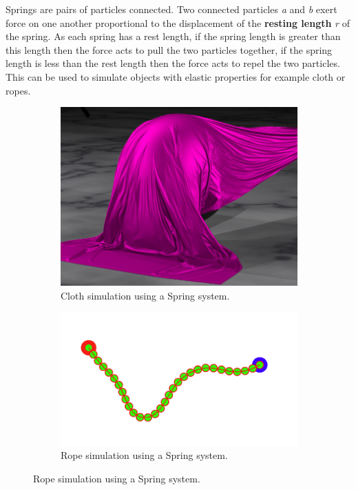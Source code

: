 Springs are pairs of particles connected. Two connected particles \emph{a} and \emph{b} exert force on one another proportional to the displacement of the \textbf{resting length} \emph{r} of the spring. As each spring has a rest length, if the spring length is greater than this length then the force acts to pull the two particles together, if the spring length is less than the rest length then the force acts to repel the two particles. This can be used to simulate objects with elastic properties for example cloth or ropes.
\begin{figure}
	\begin{subfigure}[b]{0.4\textwidth}
		\includegraphics[width=\textwidth]{cloth1}
		\caption{Cloth simulation using a Spring system.}
		\label{fig:two}
	\end{subfigure}
	\begin{subfigure}[b]{0.4\textwidth}
		\includegraphics[width=\textwidth]{rope1}
		\caption{Rope simulation using a Spring system.}
		\label{fig:three}
	\end{subfigure}
\end{figure}
